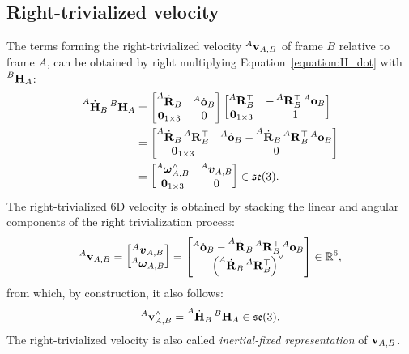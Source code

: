 \subsection{Right-trivialized velocity}
\label{sec:right_trivialized_velocity}

The terms forming the right-trivialized velocity $\velsix[A]_{A,B}$ of frame $B$ relative to frame $A$, can be obtained by right multiplying Equation~\eqref{equation:H_dot} with $\homo[B]_A$:
%
\begin{align*}
    \homod[A]_B \homo[B]_A
    &= \begin{bmatrix}
        \rotd[A]_B & \orid[A]_B \\ \zeros_{1\times 3} & 0
    \end{bmatrix}
    \begin{bmatrix}
        \rot[A]_B^\top & -\rot[A]_B^\top \ori[A]_B \\
        \zeros_{1\times3} & 1
    \end{bmatrix} \\
    &= \begin{bmatrix}
        \rotd[A]_B \rot[A]_B^\top & \orid[A]_B - \rotd[A]_B \rot[A]_B^\top \ori[A]_B \\
        \zeros_{1\times 3} & 0
    \end{bmatrix} \\
    &=
    \begin{bmatrix}
        \velang[A]_{A,B}^\wedge & \vellin[A]_{A,B} \\
        \zeros_{1\times 3} & 0
    \end{bmatrix}
    \in \se(3)
    .
\end{align*}
%
The right-trivialized 6D velocity is obtained by stacking the linear and angular components of the right trivialization process:
%
\begin{equation*}
    \velsix[A]_{A,B} =
    \begin{bmatrix}
        \vellin[A]_{A,B} \\ \velang[A]_{A,B}
    \end{bmatrix} =
    \begin{bmatrix}
        \orid[A]_B - \rotd[A]_B \rot[A]_B^\top \ori[A]_B \\
        \left( \rotd[A]_B \rot[A]_B^\top \right)^\vee
    \end{bmatrix}
    \in \realn^6
    ,
\end{equation*}
%
from which, by construction, it also follows:
%
\begin{equation*}
    \velsix[A]_{A,B}^\wedge = \homod[A]_B \homo[B]_A \in \se(3)
    .
\end{equation*}
%
The right-trivialized velocity is also called \emph{inertial-fixed representation} of $\velsix_{A,B}$.

